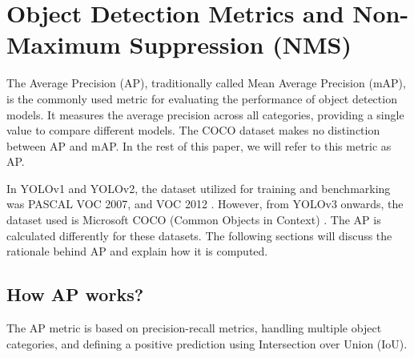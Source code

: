 \documentclass{article}
\begin{document}
\section{Object Detection Metrics and Non-Maximum Suppression (NMS)}


The Average Precision (AP), traditionally called Mean Average Precision (mAP), is the commonly used metric for evaluating the performance of object detection models. It measures the average precision across all categories, providing a single value to compare different models. The COCO dataset makes no distinction between AP and mAP. In the rest of this paper, we will refer to this metric as AP.


In YOLOv1 and YOLOv2, the dataset utilized for training and benchmarking was PASCAL VOC 2007, and VOC 2012 \cite{everingham2010pascal}. However, from YOLOv3 onwards, the dataset used is Microsoft COCO (Common Objects in Context) \cite{COCO}. The AP is calculated differently for these datasets. The following sections will discuss the rationale behind AP and explain how it is computed.


\subsection{How AP works?}




The AP metric is based on precision-recall metrics, handling multiple object categories, and defining a positive prediction using Intersection over Union (IoU).
\end{document}
